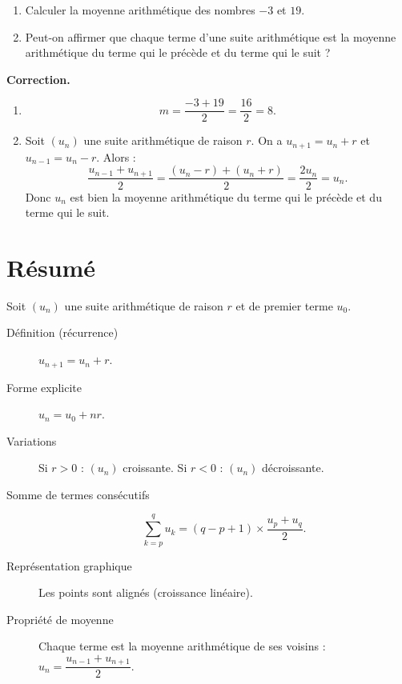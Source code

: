 \documentclass[10pt,a4paper]{article}
\newenvironment{correction}{\par\medskip\noindent\textbf{Correction.} }{\par\medskip}
\begin{document}
\begin{meth}

	\begin{enumerate}
		\item[a)] Calculer la moyenne arithmétique des nombres $-3$ et $19$.
		\item[b)] Peut-on affirmer que chaque terme d'une suite arithmétique est la moyenne arithmétique du terme qui le précède et du terme qui le suit ?
	\end{enumerate}

	\begin{correction}
		\begin{enumerate}
			\item[a)]
			      $$
				      m = \frac{-3 + 19}{2} = \frac{16}{2} = 8.
			      $$

			\item[b)] Soit $(u_n)$ une suite arithmétique de raison $r$. On a $u_{n+1} = u_n + r$ et $u_{n-1} = u_n - r$. Alors :
			      $$
				      \frac{u_{n-1} + u_{n+1}}{2} = \frac{(u_n - r) + (u_n + r)}{2} = \frac{2u_n}{2} = u_n.
			      $$
			      Donc $u_n$ est bien la moyenne arithmétique du terme qui le précède et du terme qui le suit.
		\end{enumerate}
	\end{correction}
\end{meth}

\section*{Résumé}

Soit $(u_n)$ une suite arithmétique de raison $r$ et de premier terme $u_0$.

\begin{description}
	\item[Définition (récurrence)] $u_{n+1} = u_n + r$.
	\item[Forme explicite] $u_n = u_0 + nr$.
	\item[Variations] Si $r > 0$ : $(u_n)$ croissante. Si $r < 0$ : $(u_n)$ décroissante.
	\item[Somme de termes consécutifs]
	      $$
		      \sum_{k=p}^{q} u_k = (q-p+1) \times \frac{u_p + u_q}{2}.
	      $$
	\item[Représentation graphique] Les points sont alignés (croissance linéaire).
	\item[Propriété de moyenne] Chaque terme est la moyenne arithmétique de ses voisins :
	      $u_n = \dfrac{u_{n-1} + u_{n+1}}{2}$.
\end{description}
\end{document}
